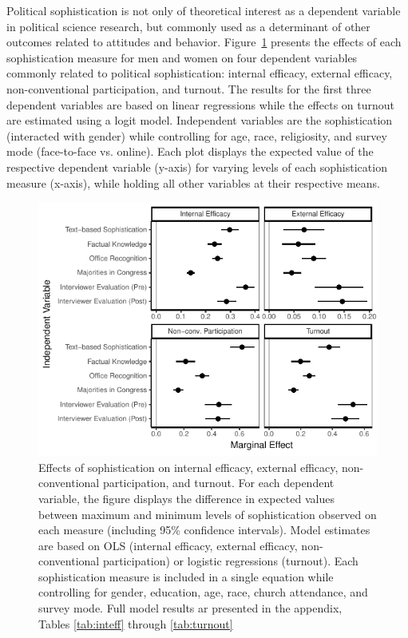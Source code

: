 \documentclass[12pt]{article}
\begin{document}
Political sophistication is not only of theoretical interest as a dependent variable in political science research, but commonly used as a determinant of other outcomes related to attitudes and behavior. Figure~\ref{fig:knoweff} presents the effects of each sophistication measure for men and women on four dependent variables commonly related to political sophistication: internal efficacy, external efficacy, non-conventional participation, and turnout. The results for the first three dependent variables are based on linear regressions while the effects on turnout are estimated using a logit model. Independent variables are the sophistication (interacted with gender) while controlling for age, race, religiosity, and survey mode (face-to-face vs. online). Each plot displays the expected value of the respective dependent variable (y-axis) for varying levels of each sophistication measure (x-axis), while holding all other variables at their respective means.

\begin{figure}[h]\centering
\includegraphics{../fig/knoweff.pdf}
\caption{Effects of sophistication on internal efficacy, external efficacy, non-conventional participation, and turnout. For each dependent variable, the figure displays the difference in expected values between maximum and minimum levels of sophistication observed on each measure (including 95\% confidence intervals). Model estimates are based on OLS (internal efficacy, external efficacy, non-conventional participation) or logistic regressions (turnout). Each sophistication measure is included in a single equation while controlling for gender, education, age, race, church attendance, and survey mode. Full model results ar presented in the appendix, Tables \ref{tab:inteff} through \ref{tab:turnout}}\label{fig:knoweff}
\end{figure}
\end{document}
